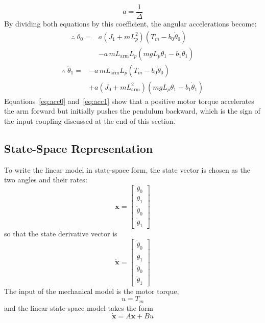 \documentclass[a4paper,11pt]{article}
\newcommand{\La}{L_{\mathrm{arm}}}
\begin{document}
\begin{equation}
  a = \frac{1}{\Delta}
\end{equation}
By dividing both equations by this coefficient, the angular accelerations become:
\begin{equation}
\begin{aligned}
  \therefore\; \ddot\theta_0 = {}& a\left(J_1 + m L_p^2\right)\left(T_m - b_0 \dot\theta_0\right)\\
  & - a\, m \La L_p \left(m g L_p \theta_1 - b_1 \dot\theta_1\right)
\end{aligned}
\label{eq:acc0}
\end{equation}
\begin{equation}
\begin{aligned}
  \therefore\; \ddot\theta_1 = {}& -a\, m \La L_p \left(T_m - b_0 \dot\theta_0\right)\\
  & + a\left(J_0 + m \La^2\right)\left(m g L_p \theta_1 - b_1 \dot\theta_1\right)
\end{aligned}
\label{eq:acc1}
\end{equation}
Equations~\ref{eq:acc0} and~\ref{eq:acc1} show that a positive motor torque accelerates the arm forward but initially pushes the pendulum backward, which is the sign of the input coupling discussed at the end of this section.

\subsection{State-Space Representation}
To write the linear model in state-space form, the state vector is chosen as the two angles and their rates:
\begin{equation}
  \mathbf{x} = \begin{bmatrix} \theta_0 \\ \theta_1 \\ \dot\theta_0 \\ \dot\theta_1 \end{bmatrix}
\end{equation}
so that the state derivative vector is
\begin{equation}
  \dot{\mathbf{x}} = \begin{bmatrix} \dot\theta_0 \\ \dot\theta_1 \\ \ddot\theta_0 \\ \ddot\theta_1 \end{bmatrix}
\end{equation}
The input of the mechanical model is the motor torque,
\begin{equation}
  u = T_m
\end{equation}
and the linear state-space model takes the form
\begin{equation}
  \dot{\mathbf{x}} = A\mathbf{x} + Bu
\end{equation}
\end{document}
